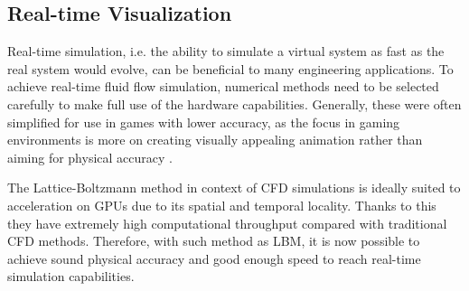 


\subsection{Real-time Visualization}
\label{rt-viz}
Real-time simulation, i.e. the ability to simulate a virtual system as fast as the real system would evolve, can be beneficial to many engineering applications. To achieve real-time fluid flow simulation, numerical methods need to be selected carefully to make full use of the hardware capabilities. Generally, these were often simplified for use in games with lower accuracy, as the focus in gaming environments is more on creating visually appealing animation rather than aiming for physical accuracy \citep{delboscRealTimeSimulationIndoor}.

The Lattice-Boltzmann method in context of CFD simulations is ideally suited to acceleration on GPUs due to its spatial and temporal locality. Thanks to this they have extremely high computational throughput compared with traditional CFD methods. Therefore, with such method as LBM, it is now possible to achieve sound physical accuracy and good enough speed to reach real-time simulation capabilities.

